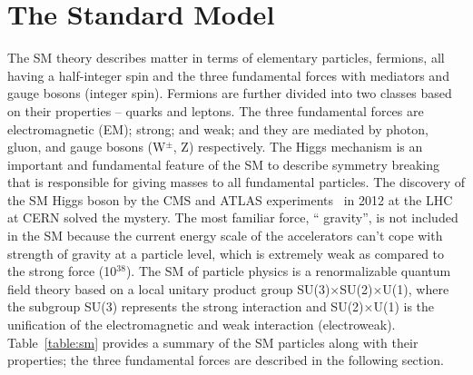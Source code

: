 \section{The Standard Model}\label{sec:sm}
The SM theory describes matter in terms of elementary particles, fermions, all having a half-integer spin and the three fundamental forces with mediators and gauge bosons (integer spin). Fermions are further divided into two classes based on their properties – quarks and leptons. The three fundamental forces are electromagnetic (EM); strong; and weak; and they are mediated by photon, gluon, and gauge bosons (W$^{\pm}$, Z) respectively. The Higgs mechanism is an important and fundamental feature of the SM to describe symmetry breaking that is responsible for giving masses to all fundamental particles. 
The discovery of the SM Higgs boson by the CMS and ATLAS experiments~\cite{cms_sm_higgs,atlas_sm_higgs} in 2012 at the LHC at CERN solved the mystery. The most familiar force, `` gravity'', is not included in the SM because the current energy scale of the accelerators can't cope with strength of gravity at a particle level, which is extremely weak as compared to the strong force (10$^{38}$). The SM of particle physics is a renormalizable quantum field theory based on a local unitary product group SU(3)$\times$SU(2)$\times$U(1), where the subgroup SU(3) represents the strong interaction and SU(2)$\times$U(1) is the unification of the electromagnetic and weak interaction (electroweak). Table~\ref{table:sm} provides a summary of the SM particles along with their properties; the three fundamental forces are described in the following section. 
